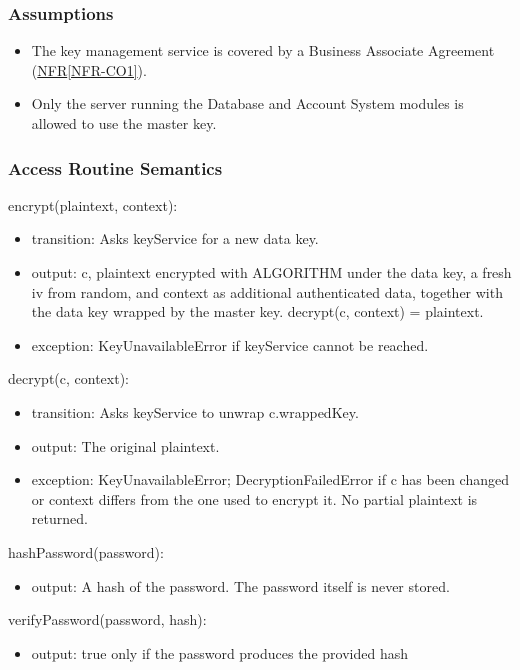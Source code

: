 \documentclass[12pt, titlepage]{article}
\newcommand{\srsref}[2]{\href{https://github.com/Nour-Fawaz/MacaBoca/blob/main/pdfs/SRS/SRS.pdf}{#1\ref*{#2}}}
\begin{document}
\subsubsection{Assumptions}
\begin{itemize}
\item The key management service is covered by a Business Associate Agreement (\srsref{NFR}{NFR-CO1}).
\item Only the server running the Database and Account System modules is allowed to use the master key.
\end{itemize}

\subsubsection{Access Routine Semantics}

\noindent encrypt(plaintext, context):
\begin{itemize}
\item transition: Asks keyService for a new data key.
\item output: c, plaintext encrypted with ALGORITHM under the data key, a fresh iv from random, and context as additional authenticated data, together with the data key wrapped by the master key. decrypt(c, context) = plaintext.
\item exception: KeyUnavailableError if keyService cannot be reached.
\end{itemize}

\noindent decrypt(c, context):
\begin{itemize}
\item transition: Asks keyService to unwrap c.wrappedKey.
\item output: The original plaintext.
\item exception: KeyUnavailableError; DecryptionFailedError if c has been changed or context differs from the one used to encrypt it. No partial plaintext is returned.
\end{itemize}

\noindent hashPassword(password):
\begin{itemize}
\item output: A hash of the password. The password itself is never stored.
\end{itemize}

\noindent verifyPassword(password, hash):
\begin{itemize}
\item output: true only if the password produces the provided hash
\end{itemize}
\end{document}
